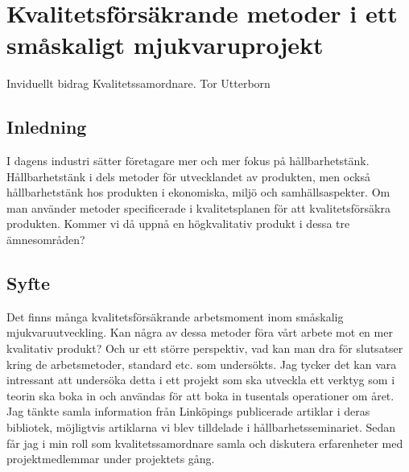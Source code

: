 \chapter{Kvalitetsförsäkrande metoder i ett småskaligt mjukvaruprojekt}


Inviduellt bidrag Kvalitetssamordnare. Tor Utterborn
\section{Inledning}
I dagens industri sätter företagare mer och mer fokus på hållbarhetstänk. Hållbarhetstänk i dels metoder för utvecklandet av produkten, men också hållbarhetstänk hos produkten i ekonomiska,  miljö och samhällsaspekter.
Om man använder metoder specificerade i kvalitetsplanen för att kvalitetsförsäkra produkten. Kommer vi då uppnå en högkvalitativ produkt i dessa tre ämnesområden?
\section{Syfte}
Det finns många kvalitetsförsäkrande arbetsmoment inom småskalig mjukvaruutveckling. Kan några av dessa metoder föra vårt arbete mot en mer kvalitativ produkt? Och ur ett större perspektiv, vad kan man dra för slutsatser kring de arbetsmetoder, standard etc. som undersökts. 
Jag tycker det kan vara intressant att undersöka detta i ett projekt som ska utveckla ett verktyg som i teorin ska boka in och användas för att boka in tusentals operationer om året.
Jag tänkte samla information från Linköpings publicerade artiklar i deras bibliotek, möjligtvis artiklarna vi blev tilldelade i hållbarhetsseminariet. Sedan får jag i min roll som kvalitetssamordnare samla och diskutera erfarenheter med projektmedlemmar under projektets gång.
